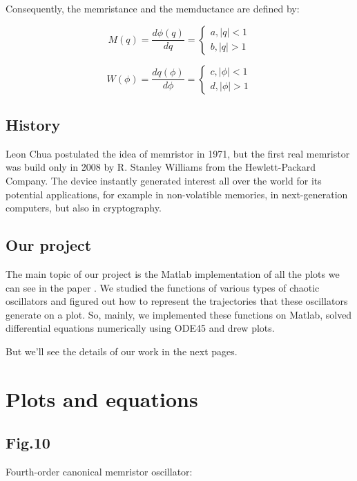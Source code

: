 \documentclass[12pt, a4paper]{paper}
\begin{document}
 Consequently, the memristance and the memductance are defined by: 
 
\begin{equation}
M(q)=\frac{d\phi(q)}{dq}=
\begin{cases}
a, |q|<1
\\
b, |q|>1
\end{cases}
\end{equation}

\begin{equation}
W(\phi)=\frac{dq(\phi)}{d\phi}=
\begin{cases}
c, |\phi|<1
\\
d, |\phi|>1
\end{cases}
\end{equation}

\subsection{History}

Leon Chua postulated the idea of memristor in 1971, but the first real memristor
was build only in 2008 by R. Stanley Williams from the Hewlett-Packard Company.
The device instantly generated interest all over the world for its potential
applications, for example in non-volatible memories, in next-generation computers,
but also in cryptography.

\subsection{Our project}

The main topic of our project is the Matlab implementation of all the plots we
can see in the paper \cite{itoh2008memristor}.
We studied the functions of various types of chaotic oscillators and figured out how
to represent the trajectories that these oscillators generate on a plot.
So, mainly, we implemented these functions on Matlab, solved differential 
equations numerically using ODE45 and drew plots.

But we'll see the details of our work in the next pages.

\newpage
\section{Plots and equations}

\subsection{Fig.10}
Fourth-order canonical memristor oscillator:
\end{document}
